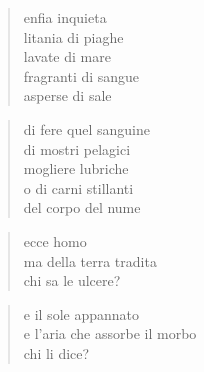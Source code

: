 \clearpage


\begin{verse}
    enfia inquieta\\
    litania di piaghe\\
    lavate di mare\\
    fragranti di sangue\\
    asperse di sale
\end{verse}

\begin{verse}
    di fere quel sanguine\\
    di mostri pelagici\\
    mogliere lubriche\\
    o di carni stillanti\\
    del corpo del nume
\end{verse}

\begin{verse}
    ecce homo\\
    ma della terra tradita\\
    chi sa le ulcere?
\end{verse}

\begin{verse}
    e il sole appannato\\
    e l’aria che assorbe il morbo\\
    chi li dice?
\end{verse}
